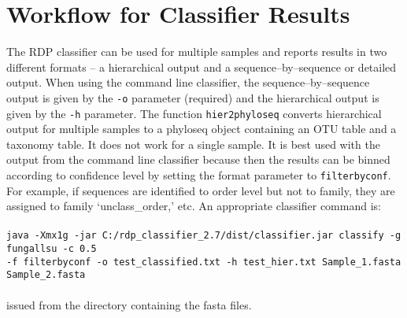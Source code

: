 \documentclass{article}
\begin{document}
\section*{Workflow for Classifier Results}
The RDP classifier can be used for multiple samples and  reports results in two different formats -- a hierarchical output and a sequence--by--sequence  or detailed output.  When using the command line classifier, the sequence--by--sequence output is given by the \texttt{-o} parameter (required) and the hierarchical output is given by the \texttt{-h} parameter.  The function \texttt{hier2phyloseq} converts hierarchical output for multiple samples to a phyloseq object containing an OTU table and a taxonomy table.  It does not work for a single sample.  It is best used with the output from the command line classifier because then the results can be binned according to confidence level by setting the format parameter to  \texttt{filterbyconf}.  For example, if sequences are identified to order level but not to family, they are assigned to family `unclass\_order,' etc.  An appropriate classifier command is:\\ \\
\texttt{java -Xmx1g -jar C:/rdp\_classifier\_2.7/dist/classifier.jar classify -g fungallsu -c 0.5 \\-f filterbyconf -o test\_classified.txt -h test\_hier.txt Sample\_1.fasta Sample\_2.fasta}\\ \\issued from the directory containing the fasta files.
\end{document}

